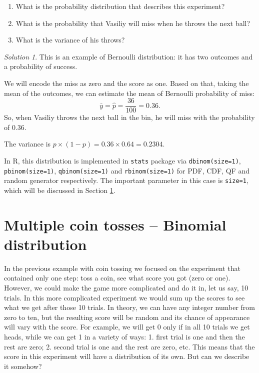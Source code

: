 \documentclass[
]{book}
\providecommand{\tightlist}{%
  \setlength{\itemsep}{0pt}\setlength{\parskip}{0pt}}
\theoremstyle{definition}
\theoremstyle{definition}
\theoremstyle{definition}
\theoremstyle{definition}
\theoremstyle{remark}
\newtheorem*{solution}{Solution}
\begin{document}
\begin{enumerate}
\def\labelenumi{\arabic{enumi}.}
\tightlist
\item
  What is the probability distribution that describes this experiment?
\item
  What is the probability that Vasiliy will miss when he throws the next ball?
\item
  What is the variance of his throws?
\end{enumerate}

\begin{solution}
This is an example of Bernoulli distribution: it has two outcomes and a probability of success.

We will encode the miss as zero and the score as one. Based on that, taking the mean of the outcomes, we can estimate the mean of Bernoulli probability of miss:
\begin{equation*}
    \bar{y} = \hat{p} = \frac{36}{100} = 0.36.
\end{equation*}
So, when Vasiliy throws the next ball in the bin, he will miss with the probability of 0.36.

The variance is \(p \times (1-p) = 0.36 \times 0.64 = 0.2304\).
\end{solution}

In R, this distribution is implemented in \texttt{stats} package via \texttt{dbinom(size=1)}, \texttt{pbinom(size=1)}, \texttt{qbinom(size=1)} and \texttt{rbinom(size=1)} for PDF, CDF, QF and random generator respectively. The important parameter in this case is \texttt{size=1}, which will be discussed in Section \ref{distributionBinomial}.

\hypertarget{distributionBinomial}{%
\section{Multiple coin tosses -- Binomial distribution}\label{distributionBinomial}}

In the previous example with coin tossing we focused on the experiment that contained only one step: toss a coin, see what score you got (zero or one). However, we could make the game more complicated and do it in, let us say, 10 trials. In this more complicated experiment we would sum up the scores to see what we get after those 10 trials. In theory, we can have any integer number from zero to ten, but the resulting score will be random and its chance of appearance will vary with the score. For example, we will get 0 only if in all 10 trials we get heads, while we can get 1 in a variety of ways: 1. first trial is one and then the rest are zero; 2. second trial is one and the rest are zero, etc. This means that the score in this experiment will have a distribution of its own. But can we describe it somehow?
\end{document}
